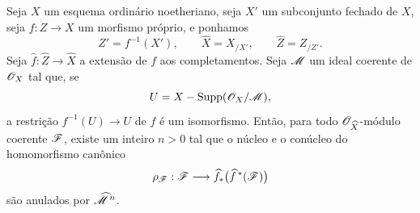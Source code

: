 \begin{lemma}[5.3.4]
\label{III.5.3.4}
Seja $X$ um esquema ordinário noetheriano, seja $X'$ um subconjunto
fechado de $X$, seja $f:Z\to X$ um morfismo próprio, e ponhamos
\[
  Z'=f^{-1}(X'),\qquad
  \widehat{X}=X_{/X'},\qquad
  \widehat{Z}=Z_{/Z'}.
\]
Seja $\widehat{f}:\widehat{Z}\to\widehat{X}$ a extensão de $f$
aos completamentos. Seja $\mathscr{M}$ um ideal coerente de
$\mathscr{O}_X$ tal que, se
\[
  U=X-\operatorname{Supp}(\mathscr{O}_X/\mathscr{M}),
\]
a restrição $f^{-1}(U)\to U$ de $f$ é um isomorfismo. Então,
para todo $\mathscr{O}_{\widehat{X}}$-módulo coerente $\mathscr{F}$, existe
um inteiro $n>0$ tal que o núcleo e o conúcleo do homomorfismo
canônico
\[
  \rho_{\mathscr{F}}:
  \mathscr{F}\longrightarrow
  \widehat{f}_*\bigl(\widehat{f}^{\,*}(\mathscr{F})\bigr)
\]
 são anulados por
$\widehat{\mathscr{M}}^{\,n}$.
\end{lemma}

